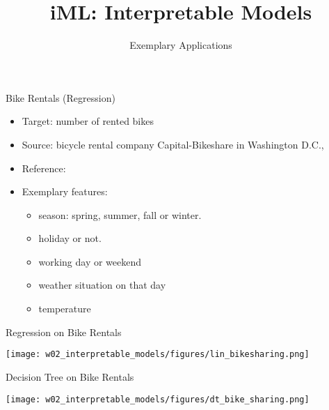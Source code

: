 \documentclass[aspectratio=169]{../latex_main/tntbeamer}  %
\title[Introduction]{iML: Interpretable Models}
\subtitle{Exemplary Applications}
\begin{document}
	
	\maketitle


    \begin{frame}{Bike Rentals (Regression)}
        
        \begin{itemize}
            \item Target: number of rented bikes
            \item Source: bicycle rental company Capital-Bikeshare in Washington D.C.,
            \item Reference: 
            \item Exemplary features:
            \begin{itemize}
                \item season: spring, summer, fall or winter.
                \item holiday or not.
                \item working day or weekend
                \item weather situation on that day 
                \item temperature
            \end{itemize}
        \end{itemize}
        
    \end{frame}
    
    \begin{frame}{Regression on Bike Rentals}
        
        \centering
        \texttt{[image: w02\_interpretable\_models/figures/lin\_bikesharing.png]}

    \end{frame}
    
    \begin{frame}{Decision Tree on Bike Rentals}
        
        \centering
        \texttt{[image: w02\_interpretable\_models/figures/dt\_bike\_sharing.png]}

    \end{frame}
    
\end{document}
